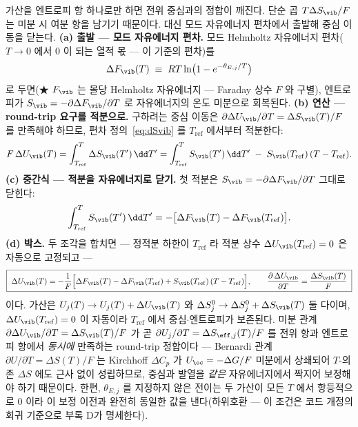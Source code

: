 가산을 엔트로피 항 하나로만 하면 전위 중심과의 정합이 깨진다. 단순 곱 $T\Delta S_\vib/F$ 는 미분 시 여분
항을 남기기 때문이다. 대신 모드 자유에너지 편차에서 출발해 중심 이동을 닫는다.
\textbf{(a) 출발 --- 모드 자유에너지 편차.} 모드 Helmholtz 자유에너지 편차($T\!\to\!0$ 에서 $0$ 이 되는
열적 몫 --- 이 기준의 편차)를
\[
\Delta F_\vib(T)\;\equiv\; RT\ln\bigl(1-e^{-\theta_{E,j}/T}\bigr)
\]
로 두면(★ $F_\vib$ 는 몰당 Helmholtz 자유에너지 --- Faraday 상수 $F$ 와 구별), 엔트로피가 $S_\vib=-\partial
\Delta F_\vib/\partial T$ 로 자유에너지의 온도 미분으로 회복된다. \textbf{(b) 연산 --- round-trip 요구를
적분으로.} 구하려는 중심 이동은 $\partial\Delta U_\vib/\partial T=\Delta S_\vib(T)/F$ 를 만족해야 하므로,
편차 정의~\eqref{eq:dSvib} 를 $T_\mathrm{ref}$ 에서부터 적분한다:
\[
F\,\Delta U_\vib(T)=\int_{T_\mathrm{ref}}^{T}\Delta S_\vib(T')\,\dd T'
=\int_{T_\mathrm{ref}}^{T}S_\vib(T')\,\dd T'\;-\;S_\vib(T_\mathrm{ref})\,(T-T_\mathrm{ref}).
\]
\textbf{(c) 중간식 --- 적분을 자유에너지로 닫기.} 첫 적분은 $S_\vib=-\partial\Delta F_\vib/\partial T$
그대로 닫힌다:
\[
\int_{T_\mathrm{ref}}^{T}S_\vib(T')\,\dd T'
=-\bigl[\Delta F_\vib(T)-\Delta F_\vib(T_\mathrm{ref})\bigr].
\]
\textbf{(d) 박스.} 두 조각을 합치면 --- 정적분 하한이 $T_\mathrm{ref}$ 라 적분 상수
$\Delta U_\vib(T_\mathrm{ref})=0$ 은 자동으로 고정되고 ---
\begin{equation}
\boxed{\;
\Delta U_\vib(T)=-\frac1F\Bigl[\Delta F_\vib(T)-\Delta F_\vib(T_\mathrm{ref})+S_\vib(T_\mathrm{ref})\,(T-T_\mathrm{ref})\Bigr],
\qquad
\frac{\partial\,\Delta U_\vib}{\partial T}=\frac{\Delta S_\vib(T)}{F}\;}
\label{eq:dUvib}
\end{equation}
이다. 가산은 $U_j(T)\to U_j(T)+\Delta U_\vib(T)$ 와 $\Delta S^0_j\to\Delta S^0_j+\Delta S_\vib(T)$ 둘 다이며,
$\Delta U_\vib(T_\mathrm{ref})=0$ 이 자동이라 $T_\mathrm{ref}$ 에서 중심$\cdot$엔트로피가 보존된다. 미분 관계
$\partial\Delta U_\vib/\partial T=\Delta S_\vib(T)/F$ 가 곧 $\partial U_j/\partial T=\Delta S_{\eff,j}(T)/F$ 를 전위
항과 엔트로피 항에서 \emph{동시에} 만족하는 round-trip 정합이다 --- Bernardi 관계 $\partial U/\partial
T=\Delta S(T)/F$ 는 Kirchhoff $\Delta C_p$ 가 $U_\oc={-}\Delta G/F$ 미분에서 상쇄되어 $T$-의존 $\Delta S$ 에도
근사 없이 성립하므로, 중심과 발열을 \emph{같은} 자유에너지에서 짝지어 보정해야 하기 때문이다. 한편,
$\theta_{E,j}$ 를 지정하지 않은 전이는 두 가산이 모든 $T$ 에서 항등적으로 $0$ 이라 이 보정 이전과 완전히
동일한 값을 낸다(하위호환 --- 이 조건은 코드 개정의 회귀 기준으로 부록 D가 명세한다).

